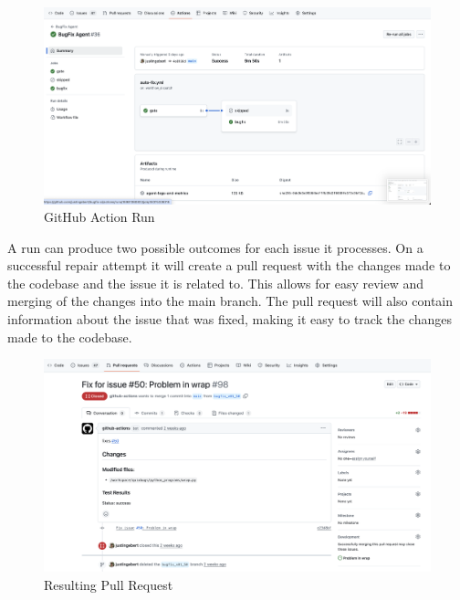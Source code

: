 \begin{figure}[H]
    \centering
    \includegraphics[width=1\textwidth]{images/workflow/Action.png}
    \caption{GitHub Action Run}
    \label{fig:apr-action}
\end{figure}

A run can produce two possible outcomes for each issue it processes. On a successful repair attempt it will create a pull request with the changes made to the codebase and the issue it is related to. This allows for easy review and merging of the changes into the main branch. The pull request will also contain information about the issue that was fixed, making it easy to track the changes made to the codebase.
\begin{figure}[H]
    \centering
    \includegraphics[width=1\textwidth]{images/workflow/PR.png}
    \caption{Resulting Pull Request}
    \label{fig:pr}
\end{figure}


